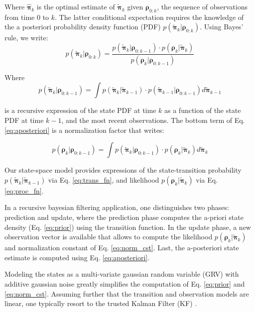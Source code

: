 Where $\bm{\hat\pi}_k$ is the optimal estimate of $\bm{\tilde\pi}_{k}$ given $\bm{\rho}_{0:k}$, the sequence of observations from time $0$ to $k$.
The latter conditional expectation requires the knowledge of the a posteriori probability density function (PDF) $p(\bm{\tilde\pi}_{k}|\bm{\rho}_{0:k})$.
Using Bayes' rule, we write:
\begin{equation}
  \label{eq:aposteriori}
  p(\bm{\tilde\pi}_{k}|\bm{\rho}_{0:k}) = \frac{p(\bm{\tilde\pi}_{k}|\bm{\rho}_{0:k-1})\cdot p(\bm{\rho}_{k}|\bm{\tilde\pi}_{k})}{p(\bm{\rho}_{k}|\bm{\rho}_{0:k-1})}
\end{equation}

Where
\begin{equation}
  \label{eq:prior}
  p(\bm{\tilde\pi}_{k}|\bm{\rho}_{0:k-1}) = \int p(\bm{\tilde\pi}_{k}|\bm{\tilde\pi}_{k-1}) \cdot p(\bm{\tilde\pi}_{k-1}|\bm{\rho}_{0:k-1}) d\bm{\tilde\pi}_{k-1}
\end{equation}

is a recursive expression of the state PDF at time $k$ as a function of the state PDF at time $k-1$, and the most recent observations.
The bottom term of Eq. \ref{eq:aposteriori} is a normalization factor that writes:

\begin{equation}
  \label{eq:norm_cst}
  p(\bm{\rho}_{k}|\bm{\rho}_{0:k-1}) = \int p(\bm{\tilde\pi}_{k}|\bm{\rho}_{0:k-1}) \cdot p(\bm{\rho}_{k}|\bm{\tilde\pi}_{k}) d\bm{\tilde\pi}_{k}
\end{equation}

Our state-space model provides expressions of the state-transition probability $p(\bm{\tilde\pi}_{k}|\bm{\tilde\pi}_{k-1})$ via Eq. \ref{eq:trans_fn}, and likelihood $p(\bm{\rho}_{k}|\bm{\tilde\pi}_{k})$ via Eq. \ref{eq:proc_fn}.

In a recursive bayesian filtering application, one distinguishes two phases: prediction and update, where the prediction phase computes the a-priori state density (Eq. \ref{eq:prior}) using the transition function.
In the update phase, a new observation vector is available that allows to compute the likelihood $p(\bm{\rho}_{k}|\bm{\tilde\pi}_{k})$ and normalization constant of Eq. \ref{eq:norm_cst}.
Last, the a-posteriori state estimate is computed using Eq. \ref{eq:aposteriori}.

Modeling the states as a multi-variate gaussian random variable (GRV) with additive gaussian noise greatly simplifies the computation of Eq. \ref{eq:prior} and \ref{eq:norm_cst}.
Assuming further that the transition and observation models are linear, one typically resort to the trusted Kalman Filter (KF) \cite{kalman1960}.


